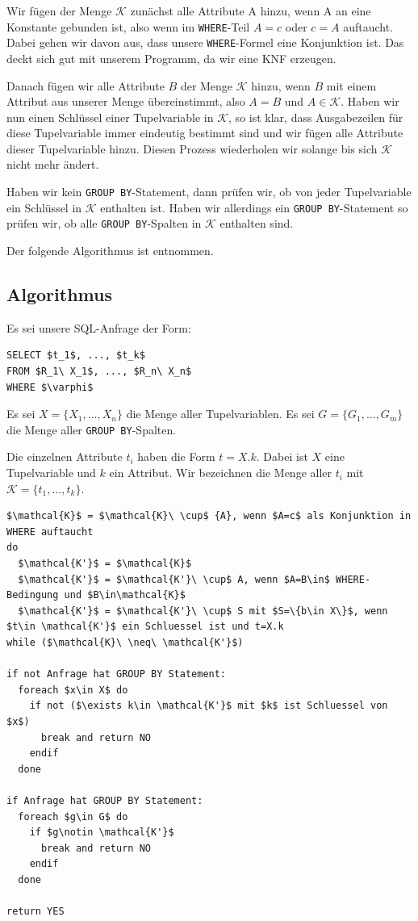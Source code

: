 Wir fügen der Menge $\mathcal{K}$ zunächst alle Attribute A hinzu, wenn A an eine Konstante gebunden ist, also wenn im \verb|WHERE|-Teil $A=c$ oder $c=A$ auftaucht. Dabei gehen wir davon aus, dass unsere \verb|WHERE|-Formel eine Konjunktion ist. Das deckt sich gut mit unserem Programm, da wir eine KNF erzeugen.

Danach fügen wir alle Attribute $B$ der Menge $\mathcal{K}$ hinzu, wenn $B$ mit einem Attribut aus unserer Menge übereinstimmt, also $A=B$ und $A\in\mathcal{K}$. Haben wir nun einen Schlüssel einer Tupelvariable in $\mathcal{K}$, so ist klar, dass Ausgabezeilen für diese Tupelvariable immer eindeutig bestimmt sind und wir fügen alle Attribute dieser Tupelvariable hinzu. Diesen Prozess wiederholen wir solange bis sich $\mathcal{K}$ nicht mehr ändert. 

Haben wir kein \verb|GROUP BY|-Statement, dann prüfen wir, ob von jeder Tupelvariable ein Schlüssel in $\mathcal{K}$ enthalten ist. Haben wir allerdings ein \verb|GROUP BY|-Statement so prüfen wir, ob alle \verb|GROUP BY|-Spalten in $\mathcal{K}$ enthalten sind.

Der folgende Algorithmus ist \cite{sql1folien} entnommen.

\subsection{Algorithmus}

Es sei unsere SQL-Anfrage der Form:

\begin{lstlisting}[mathescape]
SELECT $t_1$, ..., $t_k$
FROM $R_1\ X_1$, ..., $R_n\ X_n$
WHERE $\varphi$
\end{lstlisting}

Es sei $X=\{X_1, ..., X_n\}$ die Menge aller Tupelvariablen. Es sei $G=\{G_1, ..., G_m\}$ die Menge aller \verb|GROUP BY|-Spalten.

Die einzelnen Attribute $t_i$ haben die Form $t = X.k$. Dabei ist $X$ eine Tupelvariable und $k$ ein Attribut. Wir bezeichnen die Menge aller $t_i$ mit $\mathcal{K}=\{t_1,...,t_k\}$.

\begin{lstlisting}[mathescape]
$\mathcal{K}$ = $\mathcal{K}\ \cup$ {A}, wenn $A=c$ als Konjunktion in WHERE auftaucht
do 
  $\mathcal{K'}$ = $\mathcal{K}$
  $\mathcal{K'}$ = $\mathcal{K'}\ \cup$ A, wenn $A=B\in$ WHERE-Bedingung und $B\in\mathcal{K}$
  $\mathcal{K'}$ = $\mathcal{K'}\ \cup$ S mit $S=\{b\in X\}$, wenn $t\in \mathcal{K'}$ ein Schluessel ist und t=X.k
while ($\mathcal{K}\ \neq\ \mathcal{K'}$)

if not Anfrage hat GROUP BY Statement:
  foreach $x\in X$ do
    if not ($\exists k\in \mathcal{K'}$ mit $k$ ist Schluessel von $x$)
      break and return NO
    endif
  done

if Anfrage hat GROUP BY Statement:
  foreach $g\in G$ do
    if $g\notin \mathcal{K'}$
      break and return NO
    endif
  done

return YES
\end{lstlisting}


